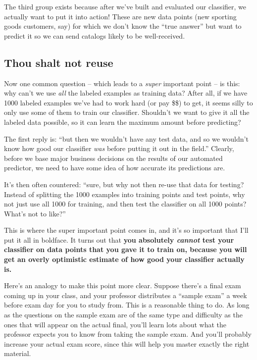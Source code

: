 The third group exists because after we've built and evaluated our classifier,
we actually want to put it into action! These are new data points (new sporting
goods customers, say) for which we don't know the ``true answer'' but want to
predict it so we can send catalogs likely to be well-received.

\subsection{Thou shalt not reuse}

\label{cantTestOnTrainingData}

Now one common question -- which leads to a \textit{super} important point --
is this: why can't we use \textit{all} the labeled examples as training data?
After all, if we have 1000 labeled examples we've had to work hard (or pay
\$\$) to get, it seems silly to only use some of them to train our classifier.
Shouldn't we want to give it all the labeled data possible, so it can learn the
maximum amount before predicting?

The first reply is: ``but then we wouldn't have any test data, and so we
wouldn't know how good our classifier \textit{was} before putting it out in the
field.'' Clearly, before we base major business decisions on the results of our
automated predictor, we need to have some idea of how accurate its predictions
are.

It's then often countered: ``sure, but why not then re-use that data for
testing? Instead of splitting the 1000 examples into training points and test
points, why not just use all 1000 for training, and then test the classifier on
all 1000 points? What's not to like?''

This is where the super important point comes in, and it's so important that
I'll put it all in boldface. It turns out that \textbf{you absolutely
\textit{cannot} test your classifier on data points that you gave it to train
on, because you will get an overly optimistic estimate of how good your
classifier actually is.}

Here's an analogy to make this point more clear. Suppose there's a final exam
coming up in your class, and your professor distributes a ``sample exam'' a
week before exam day for you to study from. This is a reasonable thing to do.
As long as the questions on the sample exam are of the same type and difficulty
as the ones that will appear on the actual final, you'll learn lots about what
the professor expects you to know from taking the sample exam. And you'll
probably increase your actual exam score, since this will help you master
exactly the right material.


